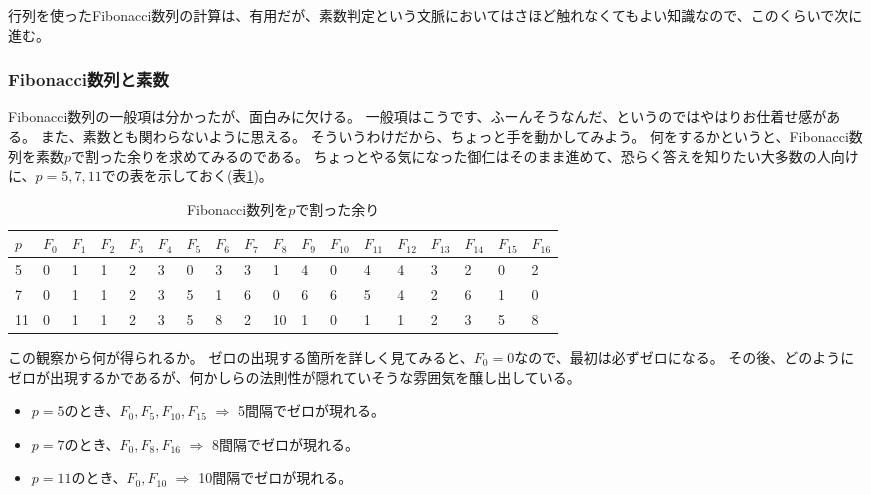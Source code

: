 
行列を使ったFibonacci数列の計算は、有用だが、素数判定という文脈においてはさほど触れなくてもよい知識なので、このくらいで次に進む。

\subsubsection{Fibonacci数列と素数}
Fibonacci数列の一般項は分かったが、面白みに欠ける。
一般項はこうです、ふーんそうなんだ、というのではやはりお仕着せ感がある。
また、素数とも関わらないように思える。
そういうわけだから、ちょっと手を動かしてみよう。
何をするかというと、Fibonacci数列を素数$p$で割った余りを求めてみるのである。
ちょっとやる気になった御仁はそのまま進めて、恐らく答えを知りたい大多数の人向けに、$p=5,7,11$での表を示しておく(表\ref{table:fibonacci_example})。

\begin{table}[htb]\label{table:fibonacci_example}
 \begin{center}
    \caption{Fibonacci数列を$p$で割った余り}
  \begin{tabular}{|l|l|l|l|l|l|l|l|l|l|l|l|l|l|l|l|l|l|}\hline
    $p$ & $F_0$ & $F_1$ & $F_2$ & $F_3$ & $F_4$ & $F_5$ & $F_6$ & $F_7$ & $F_8$ & $F_9$ & $F_{10}$ & $F_{11}$ & $F_{12}$ & $F_{13}$ & $F_{14}$ & $F_{15}$ & $F_{16}$ \\ \hline\hline
    5   & 0     & 1     & 1     & 2     & 3     & 0     & 3     & 3     & 1     & 4     & 0        & 4        & 4        & 3        & 2        & 0        & 2        \\ \hline
    7   & 0     & 1     & 1     & 2     & 3     & 5     & 1     & 6     & 0     & 6     & 6        & 5        & 4        & 2        & 6        & 1        & 0        \\ \hline
    11  & 0     & 1     & 1     & 2     & 3     & 5     & 8     & 2     & 10    & 1     & 0        & 1        & 1        & 2        & 3        & 5        & 8        \\ \hline
  \end{tabular}
  \end{center}
\end{table}

この観察から何が得られるか。
ゼロの出現する箇所を詳しく見てみると、$F_0=0$なので、最初は必ずゼロになる。
その後、どのようにゼロが出現するかであるが、何かしらの法則性が隠れていそうな雰囲気を醸し出している。
\begin{itemize}
 \item $p = 5$のとき、$F_0, F_5, F_{10}, F_{15}$ $\Rightarrow$ 5間隔でゼロが現れる。
 \item $p = 7$のとき、$F_0, F_8, F_{16}$ $\Rightarrow$ 8間隔でゼロが現れる。
 \item $p = 11$のとき、$F_0, F_{10}$ $\Rightarrow$ 10間隔でゼロが現れる。
\end{itemize}

